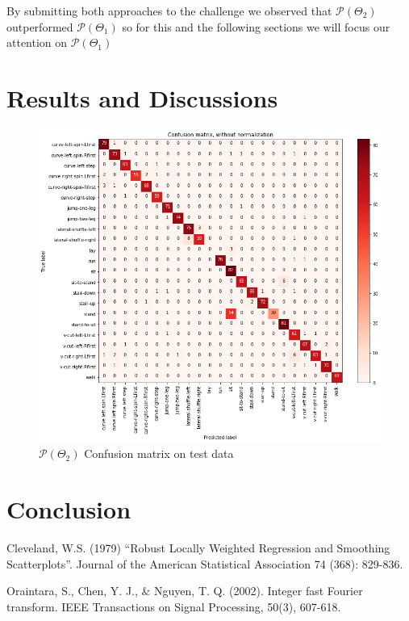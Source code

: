 By submitting both approaches to the challenge we observed that $\mathcal{P} (\Theta_{2})$ outperformed  $\mathcal{P}(\Theta_{1})$ so for this and the following sections we will focus our attention on  $\mathcal{P} (\Theta_{1})$

\section{Results and Discussions}




\begin{figure}[htpb!]
	\centering
	\includegraphics[width=\textwidth]{images/conf_ma.png}
	\caption{$\mathcal{P}(\Theta_{2})$  Confusion matrix on test data}
	\label{fig:confusion}
\end{figure}

\section{Conclusion}



\begin{thebibliography}{1}
Cleveland, W.S. (1979) “Robust Locally Weighted Regression and Smoothing Scatterplots”. Journal of the American Statistical Association 74 (368): 829-836.

Oraintara, S., Chen, Y. J., \& Nguyen, T. Q. (2002). Integer fast Fourier transform. IEEE Transactions on Signal Processing, 50(3), 607-618.

\end{thebibliography}

